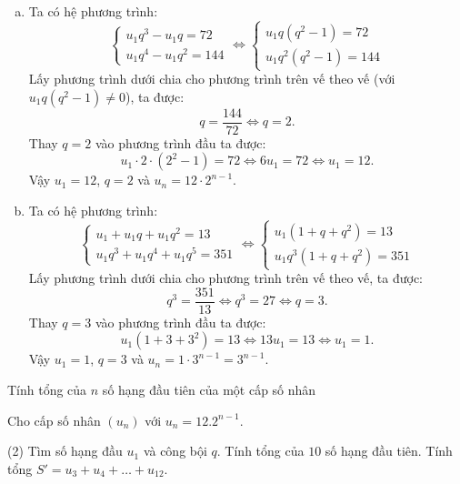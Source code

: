 \begin{vd}
{\begin{enumerate}[a)]
			\item Ta có hệ phương trình:
			$$ \begin{cases} u_1q^3 - u_1q = 72 \\ u_1q^4 - u_1q^2 = 144 \end{cases} \Leftrightarrow \begin{cases} u_1q(q^2 - 1) = 72 \\ u_1q^2(q^2 - 1) = 144 \end{cases} $$
			Lấy phương trình dưới chia cho phương trình trên vế theo vế (với $u_1q(q^2-1) \neq 0$), ta được:
			$$ q = \frac{144}{72} \Leftrightarrow q = 2. $$
			Thay $q = 2$ vào phương trình đầu ta được:
			$$ u_1 \cdot 2 \cdot (2^2 - 1) = 72 \Leftrightarrow 6u_1 = 72 \Leftrightarrow u_1 = 12. $$
			Vậy $u_1 = 12$, $q = 2$ và $u_n = 12 \cdot 2^{n-1}$.
			
			\item Ta có hệ phương trình:
			$$ \begin{cases} u_1 + u_1q + u_1q^2 = 13 \\ u_1q^3 + u_1q^4 + u_1q^5 = 351 \end{cases} \Leftrightarrow \begin{cases} u_1(1 + q + q^2) = 13 \\ u_1q^3(1 + q + q^2) = 351 \end{cases} $$
			Lấy phương trình dưới chia cho phương trình trên vế theo vế, ta được:
			$$ q^3 = \frac{351}{13} \Leftrightarrow q^3 = 27 \Leftrightarrow q = 3. $$
			Thay $q = 3$ vào phương trình đầu ta được:
			$$ u_1(1 + 3 + 3^2) = 13 \Leftrightarrow 13u_1 = 13 \Leftrightarrow u_1 = 1. $$
			Vậy $u_1 = 1$, $q = 3$ và $u_n = 1 \cdot 3^{n-1} = 3^{n-1}$.
		\end{enumerate}
	}
\end{vd}

\begin{dang}{Tính tổng của $n$ số hạng đầu tiên của một cấp số nhân}
\end{dang}

\begin{vd}
	Cho cấp số nhân $(u_n)$ với $u_n=12.2^{n-1}$. 
	\begin{tasks}(2)
		\task Tìm số hạng đầu $u_1$ và công bội $q$.	
		\task Tính tổng của $10$ số hạng đầu tiên.		
		\task Tính tổng $S'=u_3+u_4+\ldots+u_{12}$. 	
	\end{tasks}
\end{vd}

